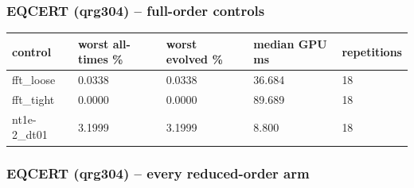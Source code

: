 \documentclass[11pt]{article}
\begin{document}
\subsubsection{EQCERT (qrg304) -- full-order controls}
\begin{table}[htbp]\centering\small
\begin{tabular}{lllll}\hline
control & worst all-times \% & worst evolved \% & median GPU ms & repetitions \\ \hline
fft\_loose & 0.0338 & 0.0338 & 36.684 & 18 \\
fft\_tight & 0.0000 & 0.0000 & 89.689 & 18 \\
nt1e-2\_dt01 & 3.1999 & 3.1999 & 8.800 & 18 \\
\hline\end{tabular}
\end{table}
\subsubsection{EQCERT (qrg304) -- every reduced-order arm}
\end{document}
